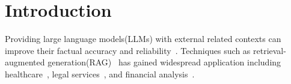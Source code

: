 



\section{Introduction}
\label{Intro}


Providing large language models(LLMs) with external related contexts can improve their factual accuracy and reliability~\cite{gao2023retrieval, lewis2020retrieval,fan2024survey}. Techniques such as retrieval-augmented generation(RAG)~\cite{lewis2020retrieval} has gained widespread application including healthcare~\cite{amugongo2024retrieval}, legal services~\cite{wiratunga2024cbr}, and financial analysis~\cite{setty2024improving}.

